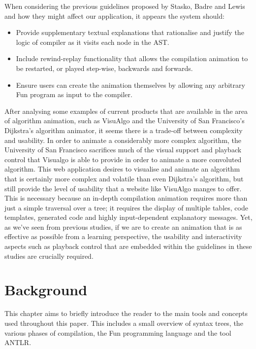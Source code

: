 \documentclass{l4proj}
\begin{document}
When considering the previous guidelines proposed by Stasko, Badre and Lewis and how they might affect our application, it appears the system should:
\begin{itemize}
\item Provide supplementary textual explanations that rationalise and justify the logic of compiler as it visits each node in the AST.
\item Include rewind-replay functionality that allows the compilation animation to be restarted, or played step-wise, backwards and forwards.
\item Ensure users can create the animation themselves by allowing any arbitrary Fun program as input to the compiler.
\end{itemize}

After analysing some examples of current products that are available in the area of algorithm animation, such as VisuAlgo and the University of San Francisco's Dijkstra's algorithm animator, it seems there is a trade-off between complexity and usability. In order to animate a considerably more complex algorithm, the University of San Francisco sacrifices much of the visual support and playback control that Visualgo is able to provide in order to animate a more convoluted algorithm. This web application desires to visualise and animate an algorithm that is certainly more complex and volatile than even Dijkstra's algorithm, but still provide the level of usability that a website like VisuAlgo manges to offer. This is necessary because an in-depth compilation animation requires more than just a simple traversal over a tree; it requires the display of multiple tables, code templates, generated code and highly input-dependent explanatory messages. Yet, as we've seen from previous studies, if we are to create an animation that is as effective as possible from a learning perspective, the usability and interactivity aspects such as playback control that are embedded within the guidelines in these studies are crucially required.

\chapter{Background}
This chapter aims to briefly introduce the reader to the main tools and concepts used throughout this paper. This includes a small overview of syntax trees, the various phases of compilation, the Fun programming language and the tool ANTLR.
\end{document}
